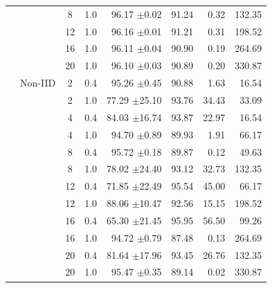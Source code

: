 \begin{table}[htbp]
{\begin{tabular}{llccrrrr}
 &  & 8 & 1.0 & 96.17 {\tiny $\pm$0.02} & 91.24 & 0.32 & 132.35 \\
 &  & 12 & 1.0 & 96.16 {\tiny $\pm$0.01} & 91.21 & 0.31 & 198.52 \\
 &  & 16 & 1.0 & 96.11 {\tiny $\pm$0.04} & 90.90 & 0.19 & 264.69 \\
 &  & 20 & 1.0 & 96.10 {\tiny $\pm$0.03} & 90.89 & 0.20 & 330.87 \\
 & Non-IID & 2 & 0.4 & 95.26 {\tiny $\pm$0.45} & 90.88 & 1.63 & 16.54 \\
 &  & 2 & 1.0 & 77.29 {\tiny $\pm$25.10} & 93.76 & 34.43 & 33.09 \\
 &  & 4 & 0.4 & 84.03 {\tiny $\pm$16.74} & 93.87 & 22.97 & 16.54 \\
 &  & 4 & 1.0 & 94.70 {\tiny $\pm$0.89} & 89.93 & 1.91 & 66.17 \\
 &  & 8 & 0.4 & 95.72 {\tiny $\pm$0.18} & 89.87 & 0.12 & 49.63 \\
 &  & 8 & 1.0 & 78.02 {\tiny $\pm$24.40} & 93.12 & 32.73 & 132.35 \\
 &  & 12 & 0.4 & 71.85 {\tiny $\pm$22.49} & 95.54 & 45.00 & 66.17 \\
 &  & 12 & 1.0 & 88.06 {\tiny $\pm$10.47} & 92.56 & 15.15 & 198.52 \\
 &  & 16 & 0.4 & 65.30 {\tiny $\pm$21.45} & 95.95 & 56.50 & 99.26 \\
 &  & 16 & 1.0 & 94.72 {\tiny $\pm$0.79} & 87.48 & 0.13 & 264.69 \\
 &  & 20 & 0.4 & 81.64 {\tiny $\pm$17.96} & 93.45 & 26.76 & 132.35 \\
 &  & 20 & 1.0 & 95.47 {\tiny $\pm$0.35} & 89.14 & 0.02 & 330.87 \\
\bottomrule
\end{tabular}%
}
\end{table}
